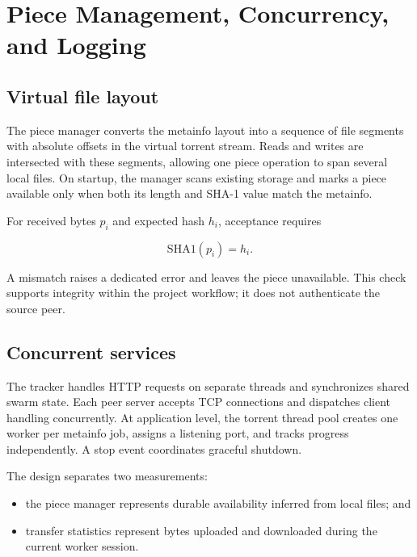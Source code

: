 \section{Piece Management, Concurrency, and Logging}
\label{sec:piece-management}

\subsection{Virtual file layout}

The piece manager converts the metainfo layout into a sequence of file segments with absolute offsets in the virtual torrent stream. Reads and writes are intersected with these segments, allowing one piece operation to span several local files. On startup, the manager scans existing storage and marks a piece available only when both its length and SHA-1 value match the metainfo.

For received bytes $p_i$ and expected hash $h_i$, acceptance requires

\begin{equation}
  \mathrm{SHA1}(p_i) = h_i.
  \label{eq:piece-integrity}
\end{equation}

A mismatch raises a dedicated error and leaves the piece unavailable. This check supports integrity within the project workflow; it does not authenticate the source peer.

\subsection{Concurrent services}

The tracker handles HTTP requests on separate threads and synchronizes shared swarm state. Each peer server accepts TCP connections and dispatches client handling concurrently. At application level, the torrent thread pool creates one worker per metainfo job, assigns a listening port, and tracks progress independently. A stop event coordinates graceful shutdown.

The design separates two measurements:

\begin{itemize}
  \item the piece manager represents durable availability inferred from local files; and
  \item transfer statistics represent bytes uploaded and downloaded during the current worker session.
\end{itemize}

